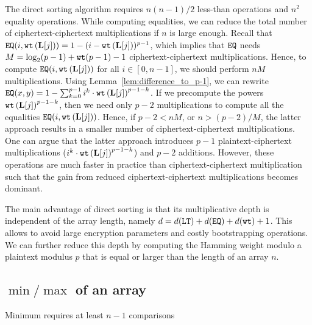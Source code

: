 	The direct sorting algorithm requires $n(n-1)/2$ less-than operations and $n^2$ equality operations.
	While computing equalities, we can reduce the total number of ciphertext-ciphertext multiplications if $n$ is large enough.
	Recall that $\mathtt{EQ}(i,\texttt{wt}\left(\mathbf{L}[j]\right)) = 1 - (i-\texttt{wt}\left(\mathbf{L}[j]\right))^{p-1}$, which implies that $\mathtt{EQ}$ needs $M = \log_2(p-1) + \texttt{wt}(p-1) - 1$ ciphertext-ciphertext multiplications.
	Hence, to compute $\mathtt{EQ}(i,\texttt{wt}\left(\mathbf{L}[j]\right))$ for all $i \in [0,n-1]$, we should perform $n M$ multiplications.
	Using Lemma~\ref{lem:difference_to_p-1}, we can rewrite $\mathtt{EQ}(x,y) = 1 - \sum_{k=0}^{p-1} i^k \cdot \texttt{wt}\left(\mathbf{L}[j]\right)^{p-1-k}$.
	If we precompute the powers $\texttt{wt}\left(\mathbf{L}[j]\right)^{p-1-k}$, then we need only $p-2$ multiplications to compute all the equalities $\mathtt{EQ}(i,\texttt{wt}\left(\mathbf{L}[j]\right))$.
	Hence, if $p-2 < nM$, or $n > (p-2)/M$, the latter approach results in a smaller number of ciphertext-ciphertext multiplications.
	One can argue that the latter approach introduces $p-1$ plaintext-ciphertext multiplications ($i^k \cdot \texttt{wt}\left(\mathbf{L}[j]\right)^{p-1-k}$) and $p-2$ additions. 
	However, these operations are much faster in practice than ciphertext-ciphertext multiplication such that the gain from reduced ciphertext-ciphertext multiplications becomes dominant. 
	
	The main advantage of direct sorting is that its multiplicative depth is independent of the array length, namely $d = d(\mathtt{LT}) + d(\mathtt{EQ}) + d(\texttt{wt}) + 1$.
	This allows to avoid large encryption parameters and costly bootstrapping operations.
	We can further reduce this depth by computing the Hamming weight modulo a plaintext modulus $p$ that is equal or larger than the length of an array $n$.

\subsection{$\min/\max$ of an array}
\label{sec:min/max}

	Minimum requires at least $n-1$ comparisons 

